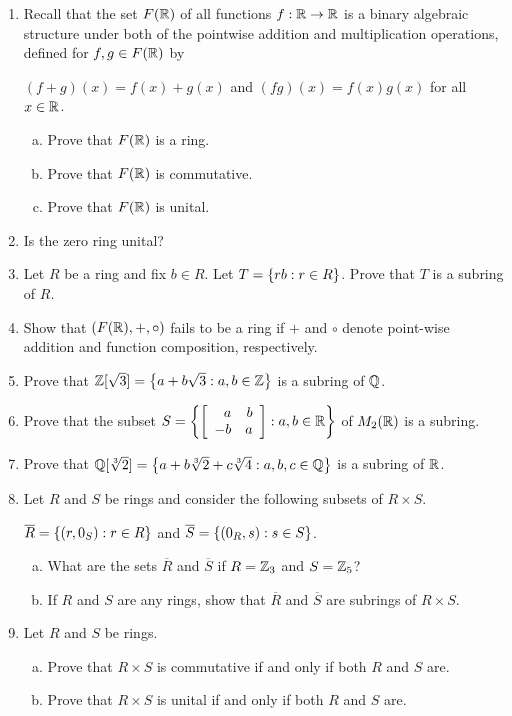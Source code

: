 \documentclass[11pt,fleqn,dvipsnames,usenames]{article}
\begin{document}
\begin{enumerate}[1.]
\item Recall that the set $F(\R)$ of all functions $f:\R\to\R$ is a binary algebraic structure under both of the pointwise addition and multiplication operations, defined for $f,g\in F(\R)$ by
\begin{center}
$(f+g)(x) = f(x) + g(x)$ and $(fg)(x) = f(x)g(x)$ for all $x\in \R$.
\end{center}
\begin{enumerate}[(a)]
\item Prove that $F(\R)$ is a ring.
\item Prove that $F(\R)$ is commutative.
\item Prove that $F(\R)$ is unital.
\end{enumerate}

\item Is the zero ring unital?
\item Let $R$ be a ring and fix $b\in R$.  Let $T = \SET{rb:r\in R}$.  Prove that $T$ is a subring of $R$.
\item Show that $(F(\R),+,\circ)$ fails to be a ring if $+$ and $\circ$ denote point-wise addition and function composition, respectively.
\item Prove that $\Z[\sqrt{3}] = \SET{a + b\sqrt{3}:a,b\in\Z}$ is a subring of $\Q$.
\item Prove that the subset $S = \SET{\MATRIX{rr}{a & b\\-b & a}:a,b\in \R}$ of $M_{2}(\R)$ is a subring.
\item Prove that $\Q[\sqrt[3]{2}] = \SET{a + b\sqrt[3]{2} + c\sqrt[3]{4}:a,b,c\in\Q}$ is a subring of $\R$.
\item Let $R$ and $S$ be rings and consider the following subsets of $R\times S$.
\begin{center}
$\overline{R} = \SET{(r,0_{S}):r\in R}$ and $\overline{S} = \SET{(0_{R}, s):s\in S}$.
\end{center}
\begin{enumerate}[(a)]
\item What are the sets $\overline{R}$ and $\overline{S}$ if $R = \Z_{3}$ and $S = \Z_{5}$?
\item If $R$ and $S$ are any rings, show that $\overline{R}$ and $\overline{S}$ are subrings of $R\times S$.
\end{enumerate}
\item Let $R$ and $S$ be rings.
\begin{enumerate}[(a)]
\item Prove that $R\times S$ is commutative if and only if both $R$ and $S$ are.
\item Prove that $R\times S$ is unital if and only if both $R$ and $S$ are.
\end{enumerate}


\end{enumerate}
\end{document}
